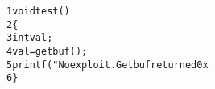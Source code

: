 \begin{alltt}
{\scriptsize   1} void test()
{\scriptsize   2} \verb:{:
{\scriptsize   3}     int val;
{\scriptsize   4}     val = getbuf(); 
{\scriptsize   5}     printf("No exploit.  Getbuf returned 0x%x\verb:\n:", val);
{\scriptsize   6} \verb:}:
\end{alltt}
